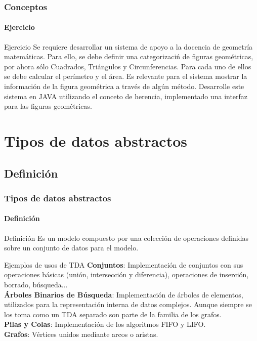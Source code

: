 \documentclass{beamer}
\begin{document}
        \begin{frame}
			\frametitle{Conceptos}
			\framesubtitle{Ejercicio}

			\begin{exampleblock}{Ejercicio}
				Se requiere desarrollar un sistema de apoyo a la docencia de geometr\'ia matem\'aticas. Para ello, se debe definir una categorizaci\'n de figuras geom\'etricas, por ahora s\'olo Cuadrados, Tri\'angulos y Circunferencias. Para cada uno de ellos se debe calcular el per\'imetro y el \'area. Es relevante para el sistema mostrar la informaci\'on de la figura geom\'etrica a trav\'es de alg\'un m\'etodo. Desarrolle este sistema en JAVA utilizando el conceto de herencia, implementado una interfaz para las figuras geom\'etricas.
			\end{exampleblock}
		\end{frame}           
    
	\section{Tipos de datos abstractos}

		\subsection{Definici\'on}

		\begin{frame}
			\frametitle{Tipos de datos abstractos}
			\framesubtitle{Definici\'on}

			\begin{block}{Definici\'on}
				Es un modelo compuesto por una colecci\'on de operaciones definidas sobre un conjunto de datos para el modelo.
			\end{block}
			\begin{block}{Ejemplos de usos de TDA}
				\textbf{Conjuntos}: Implementaci\'on de conjuntos con sus operaciones b\'asicas (uni\'on, intersecci\'on y diferencia), operaciones de inserci\'on, borrado, b\'usqueda...\\
				\textbf{\'Arboles Binarios de B\'usqueda}: Implementaci\'on de \'arboles de elementos, utilizados para la representaci\'on interna de datos complejos. Aunque siempre se los toma como un TDA separado son parte de la familia de los grafos. \\
				\textbf{Pilas y Colas}: Implementaci\'on de los algoritmos FIFO y LIFO. \\
				\textbf{Grafos}: V\'ertices unidos mediante arcos o aristas.
			\end{block}
		\end{frame}
\end{document}
